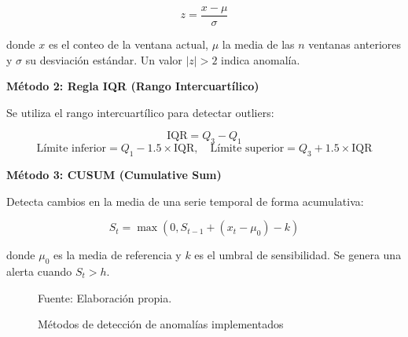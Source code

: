 \documentclass[12pt,a4paper]{article}
\renewcommand{\footnotesize}{\fontsize{10pt}{12pt}\selectfont}
\begin{document}
\[
    z = \frac{x - \mu}{\sigma}
\]

donde $x$ es el conteo de la ventana actual, $\mu$ la media de las $n$ ventanas anteriores y $\sigma$ su desviación estándar. Un valor $|z| > 2$ indica anomalía.

\textbf{Método 2: Regla IQR (Rango Intercuartílico)}

Se utiliza el rango intercuartílico para detectar outliers:

\[
    \text{IQR} = Q_3 - Q_1
\]
\[
    \text{Límite inferior} = Q_1 - 1.5 \times \text{IQR}, \quad
    \text{Límite superior} = Q_3 + 1.5 \times \text{IQR}
\]

\textbf{Método 3: CUSUM (Cumulative Sum)}

Detecta cambios en la media de una serie temporal de forma acumulativa:

\[
    S_t = \max(0, S_{t-1} + (x_t - \mu_0) - k)
\]

donde $\mu_0$ es la media de referencia y $k$ es el umbral de sensibilidad. Se genera una alerta cuando $S_t > h$.

\begin{figure}[H]
    \centering
    \caption{Métodos de detección de anomalías implementados}
    {\footnotesize Fuente: Elaboración propia.}
\end{figure}
\end{document}
